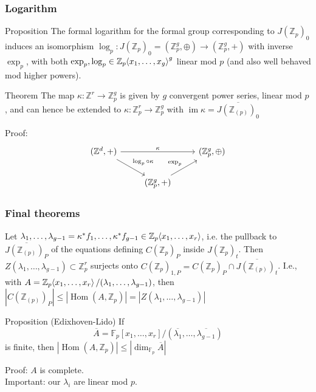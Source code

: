 \documentclass[15pt]{beamer}
\newcommand{\Z}{\mathbb{Z}}
\newcommand{\F}{\mathbb{F}}
\renewcommand{\angle}[1]{\hspace{-2pt}\left\langle #1 \right\rangle}
\DeclareMathOperator{\Hom}{Hom}
\DeclareMathOperator{\im}{im}
\begin{document}
\begin{frame}
    \frametitle{Logarithm}
    \begin{block}{Proposition}
    The formal logarithm for the formal group corresponding to $J(\Z_p)_0$ induces an isomorphism $\log_p: J(\Z_p)_0 = (\Z_p^g,\oplus) \to (\Z_p^g,+)$ with inverse $\exp_p$, with both $\exp_p,\log_p \in \Z_p\angle{x_1,\dots,x_{g}}^g$ linear mod $p$ (and also well behaved mod higher powers).
    \end{block}\pause
    \begin{block}{Theorem}
    The map $\kappa: \Z^r \to \Z_p^g$ is given by $g$ convergent power series, linear mod $p$, and can hence be extended to $\kappa: \Z_p^r \to \Z_p^g$ with $\im \kappa = \overline{J(\Z_{(p)})_0}$
    \end{block}\pause
    Proof:\[
    \begin{tikzcd}[ampersand replacement=\&]
{(\Z^d,+)} \arrow[rr, "\kappa"] \arrow[rd, "\log_p \circ \kappa"] \&                                   \& {(\Z_p^g,\oplus)} \\
                                                                  \& {(\Z_p^g,+)} \arrow[ru, "\exp_p"] \&                  
\end{tikzcd}\]
\end{frame}

\begin{frame}
    \frametitle{Final theorems}
    \begin{definition}
        Let $\lambda_1,\dots,\lambda_{g-1} = \kappa^* f_1,\dots,\kappa^* f_{g-1} \in \Z_p\angle{x_1,\dots,x_r}$, i.e. the pullback to $\overline{J(\Z_{(p)})_P}$ of the equations defining $C(\Z_p)_P$ inside $J(\Z_p)_t$. Then $Z(\lambda_1,\dots,\lambda_{g-1}) \subset \Z_p^r$ surjects onto $C(\Z_p)_{1,P} = C(\Z_p)_P \cap \overline{J(\Z_{(p)})_t}$. \pause I.e., with $A = \Z_p\angle{x_1,\dots,x_r}/(\lambda_1,\dots,\lambda_{g-1})$, then $|C(\Z_{(p)})_P| \leq |\Hom(A,\Z_p)| = |Z(\lambda_1,\dots,\lambda_{g-1})|$
    \end{definition}\pause
    \begin{block}{Proposition (Edixhoven-Lido)}
    If \[\overline{A} = \F_p[x_1,\dots,x_r]/(\overline{\lambda_1},\dots,\overline{\lambda_{g-1}})\] is finite, then $|\Hom(A,\Z_p)| \leq |\dim_{\F_p} \overline{A}|$
    \end{block}\pause
    Proof: $A$ is complete.\\\pause
    Important: our $\lambda_i$ are linear mod $p$.
\end{frame}
\end{document}
